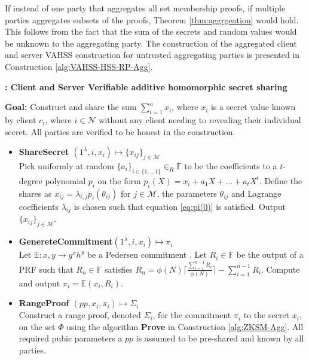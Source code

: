 If instead of one party that aggregates all set membership proofs, if multiple parties aggregates subsets of the proofs, Theorem \ref{thm:aggrgeation} would hold. This follows from the fact that the sum of the secrets and random values would be unknown to the aggregating party. The construction of the aggregated client and server VAHSS construction for untrusted aggregating parties is presented in Construction \ref{alg:VAHSS-HSS-RP-Agg}.



\begin{algorithm}
\caption{\textbf{: Client and Server Verifiable additive homomorphic secret sharing}}

\textbf{Goal:} Construct and share the sum $\sum_{i=1}^n x_i$, where $x_i$ is a secret value known by client $c_i$, where $i\in\mathcal{N}$ without any client needing to revealing their individual secret. All parties are verified to be honest in the construction.
\vspace{2pt}
\hline
\vspace{2pt}
\begin{itemize}
 \item\textbf{ShareSecret $(1^\lambda,i,x_i) \mapsto \{x_{ij}\}_{j\in\mathcal{M}}$} \\
Pick uniformly at random $\{a_i\}_{i\in\{1,..,t\}}\in_R\mathds{F}$ to be the coefficients to a $t$-degree polynomial $p_i$ on the form $p_i(X) = x_i + a_1X+...+a_tX^t$. Define  the shares as $x_{ij}=\lambda_{i,j}p_i(\theta_{ij})$ for $j\in\mathcal{M}$, the parameters $\theta_{ij}$ and Lagrange coefficients $\lambda_{ij}$ is chosen such that equation \ref{eq:pi(0)} is satisfied.
Output $\{x_{ij}\}_{j\in\mathcal{M}}$.

\item\textbf{GenereteCommitment$(1^\lambda,i,x_i) \mapsto \pi_i$ }\\
Let $\mathds{E} : x,y \to g^xh^y$ be a Pedersen commitment . Let $R_i\in\mathds{F}$ be the output of a PRF such that $R_n\in \mathds{F}$  satisfies $R_n = \phi(N)\lceil \frac{\sum_{i=1}^{n-1}R_i}{\phi(N)}\rceil- \sum_{i=1}^{n-1}R_i $. Compute and output $\pi_i = \mathds{E}(x_i,R_i)$.

\item\textbf{RangeProof $(pp,x_i,\pi_i) \mapsto \Sigma_i$}\\
Construct a range proof, denoted $\Sigma_i$, for the commitment $\pi_i$ to the secret $x_i$, on the set $\Phi$ using the algorithm \textbf{Prove} in Construction \ref{alg:ZKSM-Agg}. All required pubic parameters a $pp$ is assumed to be pre-shared and known by all parties.


\end{itemize}
\end{algorithm}
